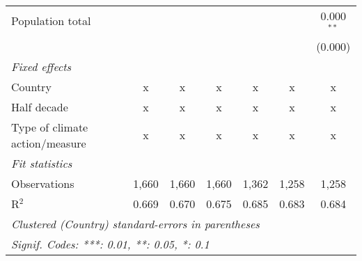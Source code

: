 \begin{tabular}{lcccccc}
   Population total                                                     &         &         &                &                &                & 0.000$^{**}$\\   
                                                                        &         &         &                &                &                & (0.000)\\   
   \emph{Fixed effects}\\
   Country                                                              & x       & x       & x              & x              & x              & x\\  
   Half decade                                                          & x       & x       & x              & x              & x              & x\\  
   Type of climate action/measure                                       & x       & x       & x              & x              & x              & x\\  
   \midrule \emph{Fit statistics}\\
   Observations                                                         & 1,660   & 1,660   & 1,660          & 1,362          & 1,258          & 1,258\\  
   R$^2$                                                                & 0.669   & 0.670   & 0.675          & 0.685          & 0.683          & 0.684\\  
   \midrule
   \multicolumn{7}{l}{\emph{Clustered (Country) standard-errors in parentheses}}\\
   \multicolumn{7}{l}{\emph{Signif. Codes: ***: 0.01, **: 0.05, *: 0.1}}\\
\end{tabular}
\par\endgroup



